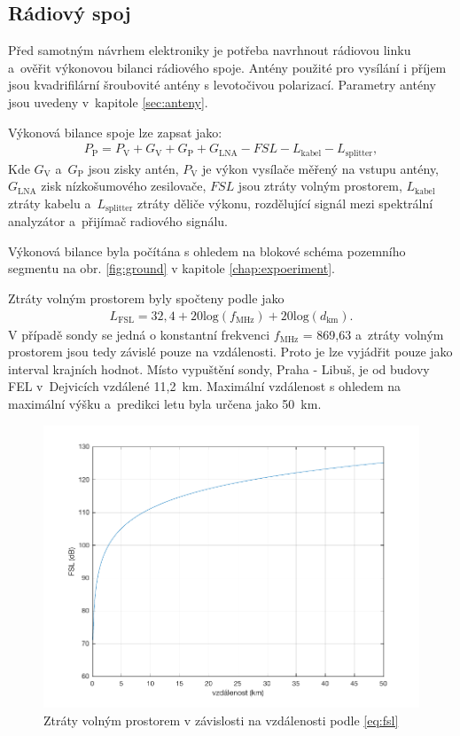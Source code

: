 \documentclass[twoside]{ctuthesis}
\newcommand{\mt}[1]{\text{#1}}
\theoremstyle{plain}
\theoremstyle{definition}
\theoremstyle{note}
\begin{document}
		\subsection{Rádiový spoj}
		Před samotným návrhem elektroniky je potřeba navrhnout rádiovou linku a~ověřit výkonovou bilanci rádiového spoje. Antény použité pro vysílání i příjem jsou kvadrifilární šroubovité antény s levotočivou polarizací. Parametry antény jsou uvedeny v~kapitole \ref{sec:anteny}.

		Výkonová bilance spoje lze zapsat jako:
		\begin{align}
			P_\mt{P} = P_\mt{V} + G_\mt{V} + G_\mt{P} + G_\mt{LNA} - FSL - L_\mt{kabel} - L_\mt{splitter},
			\label{eq:bilance}
		\end{align}
		Kde $G_\mt{V}$ a~$G_\mt{P}$ jsou zisky antén, $P_\mt{V}$ je výkon vysílače měřený na vstupu antény, $G_\mt{LNA}$ zisk nízkošumového zesilovače, $FSL$ jsou ztráty volným prostorem, $L_\mt{kabel}$ ztráty kabelu a~$L_\mt{splitter}$ ztráty děliče výkonu, rozdělující signál mezi spektrální analyzátor a~přijímač radiového signálu.

		Výkonová bilance byla počítána s ohledem na blokové schéma pozemního segmentu na obr. \ref{fig:ground} v kapitole \ref{chap:expoeriment}.

		Ztráty volným prostorem byly spočteny podle \cite{zaklady:sireni:vln} jako
		\begin{align}
			L_\mt{FSL} = 32,4 + 20\mt{log}(f_\mt{MHz}) + 20\mt{log}(d_\mt{km}).
			\label{eq:fsl}
		\end{align}
		V případě sondy se jedná o konstantní frekvenci $f_\mt{MHz}$ = 869{,}63 a~ztráty volným prostorem jsou tedy závislé pouze na vzdálenosti. Proto je lze vyjádřit pouze jako interval krajních hodnot. Místo vypuštění sondy, Praha - Libuš, je od budovy FEL v~Dejvicích vzdálené 11,2~km. Maximální vzdálenost s ohledem na maximální výšku a~predikci letu byla určena jako 50~km.
		\begin{figure}
			\centering
			\includegraphics[width = .6\textwidth]{Graphs/FSL.pdf}
			\caption{Ztráty volným prostorem v závislosti na vzdálenosti podle \eqref{eq:fsl}}
		\end{figure}
\end{document}
